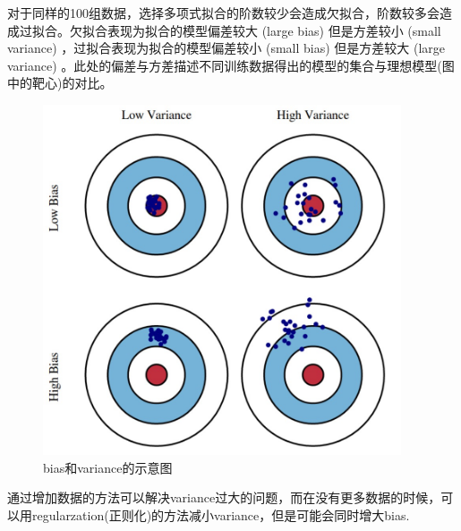 \documentclass[UTF8,a4paper]{article}
\begin{document}
对于同样的100组数据，选择多项式拟合的阶数较少会造成欠拟合，阶数较多会造成过拟合。欠拟合表现为拟合的模型偏差较大 (large bias) 但是方差较小 (small variance) ，过拟合表现为拟合的模型偏差较小 (small bias) 但是方差较大 (large variance) 。此处的偏差与方差描述不同训练数据得出的模型的集合与理想模型(图中的靶心)的对比。
\begin{figure}[ht]
\centering
\includegraphics[width=300pt]{bias-variance.png}
\caption{bias和variance的示意图}
\label{bias-variance}
\end{figure}

通过增加数据的方法可以解决variance过大的问题，而在没有更多数据的时候，可以用regularzation(正则化)的方法减小variance，但是可能会同时增大bias.
\end{document}

